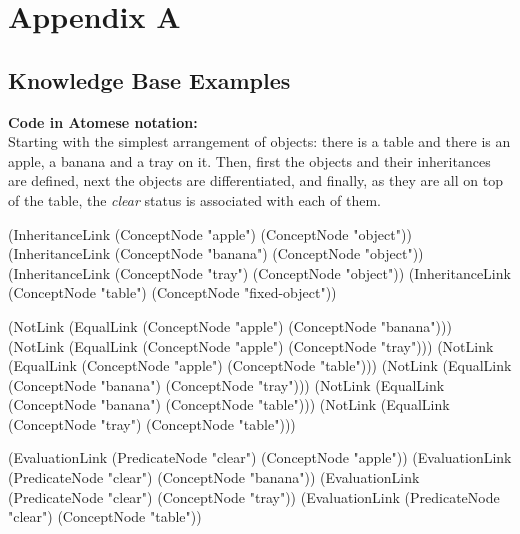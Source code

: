 \chapter{Appendix A} \label{AppendixA}

\section{Knowledge Base Examples}\label{sec:KB_examples} 

\begin{footnotesize}
\textbf{Code in Atomese notation:} \\
Starting with the simplest arrangement of objects: there is a table and there is an apple, a banana and a tray on it. Then, first the objects and their inheritances are defined, next the objects are differentiated, and finally, as they are all on top of the table, the \textit{clear} status is associated with each of them. \\
\end{footnotesize}

\begin{python}
	(InheritanceLink
		(ConceptNode "apple")
		(ConceptNode "object"))
	(InheritanceLink
		(ConceptNode "banana")
		(ConceptNode "object"))
	(InheritanceLink
		(ConceptNode "tray")
		(ConceptNode "object"))
	(InheritanceLink
		(ConceptNode "table")
		(ConceptNode "fixed-object"))

	(NotLink (EqualLink 
		(ConceptNode "apple") (ConceptNode "banana")))
	(NotLink (EqualLink 
		(ConceptNode "apple") (ConceptNode "tray")))
	(NotLink (EqualLink 
		(ConceptNode "apple") (ConceptNode "table")))
	(NotLink (EqualLink 
		(ConceptNode "banana") (ConceptNode "tray")))
	(NotLink (EqualLink 
		(ConceptNode "banana") (ConceptNode "table")))
	(NotLink (EqualLink 
		(ConceptNode "tray") (ConceptNode "table")))
	
	(EvaluationLink
		(PredicateNode "clear")
		(ConceptNode "apple"))
	(EvaluationLink
		(PredicateNode "clear")
		(ConceptNode "banana"))
	(EvaluationLink
		(PredicateNode "clear")
		(ConceptNode "tray"))
	(EvaluationLink
		(PredicateNode "clear")
		(ConceptNode "table"))
\end{python}

